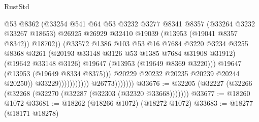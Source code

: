\begin{lexlean}{RustStd}
\begin{coremodule}
                                                @53
                                                @8362
                                                (@33254
                                                  @541
                                                  @64
                                                  @53
                                                  @3232
                                                  @3277
                                                  @8341
                                                  @8357
                                                  (@33264 @3232 @33267 @18653)
                                                  @26925
                                                  @26929
                                                  @32410
                                                  @19039
                                                  (@13953 (@19041 @8357 @8342))
                                                  @18702))
                                              (@33572
                                                @1386
                                                @103
                                                @53
                                                @16
                                                @7684
                                                @3220
                                                @3234
                                                @3255
                                                @8368
                                                @3261
                                                (@20193 @33148 @3126 @53 @1385 @7684 @31908 @31912)
                                                (@19642 @33148 @3126)
                                                @19647
                                                (@13953 (@19649 @8369 @3220)))
                                              @19647
                                              (@13953 (@19649 @8334 @8375)))
                                            @20229
                                            @20232
                                            @20235
                                            @20239
                                            @20244
                                            @20250))
                                        @33229)))))))))))
                  @26773)))))))
@33676 := @32205 (@32227 (@32266 (@32268 (@32270 (@32287 (@32303 (@32320 @33668)))))))
@33677 := @18260 @1072
@33681 := @18262 (@18266 @1072) (@18272 @1072)
@33683 := @18277 (@18171 @18278)

\end{coremodule}
\end{lexlean}
